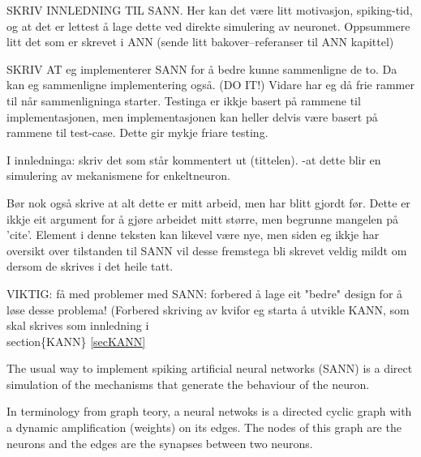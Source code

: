 	SKRIV INNLEDNING TIL SANN.
	Her kan det være litt motivasjon, spiking-tid, og at det er lettest å lage dette ved direkte simulering av neuronet.
	Oppsummere litt det som er skrevet i ANN (sende litt bakover--referanser til ANN kapittel)

	SKRIV AT eg implementerer SANN for å bedre kunne sammenligne de to. Da kan eg sammenligne implementering også. (DO IT!)
	Vidare har eg då frie rammer til når sammenligninga starter. Testinga er ikkje basert på rammene til implementasjonen, men implementasjonen kan heller delvis være basert på rammene til test-case. Dette gir mykje friare testing.

	I innledninga: skriv det som står kommentert ut (tittelen). -at dette blir en simulering av mekanismene for enkeltneuron.

	Bør nok også skrive at alt dette er mitt arbeid, men har blitt gjordt før.
	Dette er ikkje eit argument for å gjøre arbeidet mitt større, men begrunne mangelen på 'cite'.
	Element i denne teksten kan likevel være nye, men siden eg ikkje har oversikt over tilstanden til SANN vil desse fremstega bli skrevet veldig mildt om dersom de skrives i det heile tatt.

	VIKTIG: få med problemer med SANN: forbered å lage eit "bedre" design for å løse desse problema! (Forbered skriving av kvifor eg starta å utvikle KANN, som skal skrives som innledning i \\section\{KANN\} \ref{secKANN}


	The usual way to implement spiking artificial neural networks (SANN) is a direct simulation of the mechanisms that generate the behaviour of the neuron.
	
	In terminology from graph teory, a neural netwoks is a directed cyclic graph with a dynamic amplification (weights) on its edges.
	The nodes of this graph are the neurons and the edges are the synapses between two neurons.%

